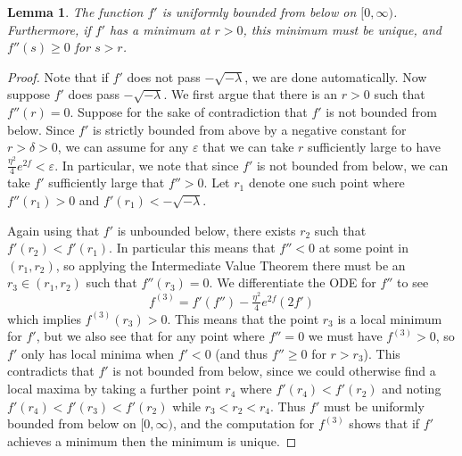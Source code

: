 \documentclass[12pt, a4paper, reqno, oneside]{amsart}
\renewcommand{\epsilon}{\varepsilon}
\numberwithin{equation}{section}
\theoremstyle{plain}
\newtheorem{lemma}[theorem]{Lemma}
\theoremstyle{definition}
\theoremstyle{plain}
\begin{document}
\begin{lemma}\label{potent_unif_lwrbnd}
  The function $f'$ is uniformly bounded from below on $[0,\infty)$. Furthermore, if $f'$ has a minimum at $r>0$, this minimum must be unique, and $f''(s)\geq 0$ for $s>r$.
\end{lemma}
\begin{proof}
  Note that if $f'$ does not pass $-\sqrt{-\lambda}$, we are done automatically. Now suppose $f'$ does pass $-\sqrt{-\lambda}$. We first argue that there is an $r>0$ such that $f''(r)=0$. Suppose for the sake of contradiction that $f'$ is not bounded from below. Since $f'$ is strictly bounded from above by a negative constant for $r>\delta>0$, we can assume for any $\epsilon$ that we can take $r$ sufficiently large to have $\tfrac{\eta^{2}}{4}e^{2f}<\epsilon$. In particular, we note that since $f'$ is not bounded from below, we can take $f'$ sufficiently large that $f''>0$. Let $r_1$ denote one such point where $f''(r_1)>0$ and $f'(r_1)<-\sqrt{-\lambda}$.

  Again using that $f'$ is unbounded below, there exists $r_2$ such that $f'(r_2)<f'(r_1)$. In particular this means that $f''<0$ at some point in $(r_1,r_2)$, so applying the Intermediate Value Theorem there must be an $r_3\in (r_1,r_2)$ such that $f''(r_3)=0$. We differentiate the ODE for $f''$ to see
  \[
    f^{(3)}=f'(f'')-\tfrac{\eta^{2}}{4}e^{2f}(2f')
  \]
  which implies $f^{(3)}(r_3)>0$. This means that the point $r_3$ is a local minimum for $f'$, but we also see that for any point where $f''=0$ we must have $f^{(3)}>0$, so $f'$ only has local minima when $f'<0$ (and thus $f''\geq 0$ for $r>r_3$). This contradicts that $f'$ is not bounded from below, since we could otherwise find a local maxima by taking a further point $r_4$ where $f'(r_4)<f'(r_2)$ and noting $f'(r_4)<f'(r_3)<f'(r_2)$ while $r_3<r_2<r_4$. Thus $f'$ must be uniformly bounded from below on $[0,\infty)$, and the computation for $f^{(3)}$ shows that if $f'$ achieves a minimum then the minimum is unique.
\end{proof}
\end{document}
